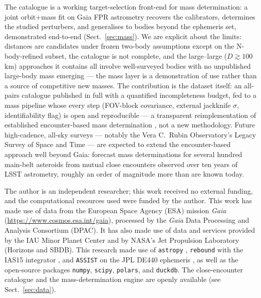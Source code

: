 \documentclass{aa}
\begin{document}
The catalogue is a working target-selection front-end for mass determination: a
joint orbit+mass fit on Gaia FPR astrometry recovers the calibrators, determines
the studied perturbers, and generalises to bodies beyond the ephemeris set,
demonstrated end-to-end (Sect.~\ref{sec:mass}). We are explicit about the
limits: distances are candidates under frozen two-body assumptions except on the
N-body-refined subset, the catalogue is not complete, and the large--large
($D\gtrsim100$\,km) approaches it contains all involve well-surveyed bodies with
no unpublished large-body mass emerging --- the mass layer is a demonstration of
use rather than a source of competitive new masses. The contribution is the dataset itself:
an all-pairs catalogue published in full with a quantified incompleteness budget,
fed to a mass pipeline whose every step (FOV-block covariance, external jackknife
$\sigma$, identifiability flag) is open and reproducible --- a transparent
reimplementation of established encounter-based mass determination
\citep{siltala2020, fuentesmunoz2025}, not a new methodology. Future
high-cadence, all-sky surveys --- notably the Vera C.\ Rubin Observatory's Legacy
Survey of Space and Time --- are expected to extend the encounter-based approach
well beyond Gaia: \citet{bernstein2025} forecast mass determinations for several
hundred main-belt asteroids from mutual close encounters observed over ten years
of LSST astrometry, roughly an order of magnitude more than are known today.

\begin{acknowledgements}
The author is an independent researcher; this work received no external funding,
and the computational resources used were funded by the author.
This work has made use of data from the European Space Agency (ESA) mission
\emph{Gaia} (\url{https://www.cosmos.esa.int/gaia}), processed by the \emph{Gaia}
Data Processing and Analysis Consortium (DPAC). It has also made use of data and
services provided by the IAU Minor Planet Center and by NASA's Jet Propulsion
Laboratory (Horizons and SBDB). This research made use of \texttt{astropy}
\citep{astropy2022}, \texttt{rebound} \citep{rein2012} with the IAS15 integrator
\citep{rein2015ias15}, and \texttt{ASSIST} \citep{holman2023} on the JPL DE440
ephemeris \citep{park2021}, as well as the open-source packages \texttt{numpy},
\texttt{scipy}, \texttt{polars}, and \texttt{duckdb}. The close-encounter
catalogue and the mass-determination engine are openly available (see
Sect.~\ref{sec:data}).
\end{acknowledgements}
\end{document}
